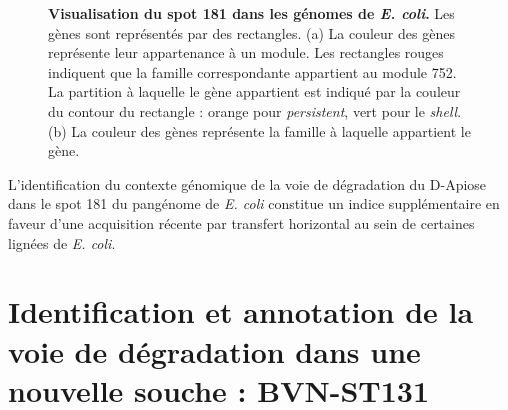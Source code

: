 \begin{figure}[htbp] 
    \centering
    \hspace{1cm}
    \caption[Visualisation du spot 181 dans les génomes de \textit{E. coli}]{\textbf{Visualisation du spot 181 dans les génomes de \textit{E. coli}.} Les gènes sont représentés par des rectangles. (a) La couleur des gènes représente leur appartenance à un module. Les rectangles rouges indiquent que la famille correspondante appartient au module 752. La partition à laquelle le gène appartient est indiqué par la couleur du contour du rectangle : orange pour \textit{persistent}, vert pour le \textit{shell}. (b) La couleur des gènes représente la famille à laquelle appartient le gène.} 
    \label{fig:spot_apiose}
\end{figure}

L’identification du contexte génomique de la voie de dégradation du D-Apiose dans le spot 181 du pangénome de \textit{E. coli} constitue un indice supplémentaire en faveur d’une acquisition récente par transfert horizontal au sein de certaines lignées de \textit{E. coli}.

\section{Identification et annotation de la voie de dégradation dans une nouvelle souche : BVN-ST131}


